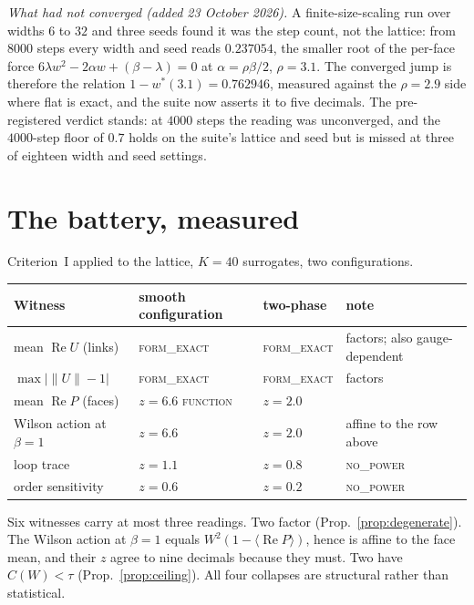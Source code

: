 \documentclass[11pt]{article}
\theoremstyle{remark}
\newcommand{\tier}[1]{\textsc{\MakeLowercase{#1}}}
\begin{document}
\emph{What had not converged (added 23 October 2026).} A finite-size-scaling run over
widths $6$ to $32$ and three seeds found it was the step count, not the lattice: from
$8000$ steps every width and seed reads $0.237054$, the smaller root of the per-face force
$6\lambda w^2 - 2\alpha w + (\beta-\lambda) = 0$ at $\alpha=\rho\beta/2$, $\rho=3.1$. The
converged jump is therefore the relation $1-w^*(3.1)=0.762946$, measured against the
$\rho=2.9$ side where flat is exact, and the suite now asserts it to five decimals. The
pre-registered verdict stands: at $4000$ steps the reading was unconverged, and the
$4000$-step floor of $0.7$ holds on the suite's lattice and seed but is missed at three of
eighteen width and seed settings.

\section{The battery, measured}\label{sec:battery}

Criterion~I applied to the lattice, $K=40$ surrogates, two configurations.

\begin{center}\small
\begin{tabular}{llll}
\toprule
Witness & smooth configuration & two-phase & note \\
\midrule
mean $\operatorname{Re}U$ (links) & \tier{FORM\_EXACT} & \tier{FORM\_EXACT} & factors; also gauge-dependent \\
$\max|\|U\|-1|$ & \tier{FORM\_EXACT} & \tier{FORM\_EXACT} & factors \\
mean $\operatorname{Re}P$ (faces) & $z=6.6$ \tier{FUNCTION} & $z=2.0$ & \\
Wilson action at $\beta=1$ & $z=6.6$ & $z=2.0$ & affine to the row above \\
loop trace & $z=1.1$ & $z=0.8$ & \tier{NO\_POWER} \\
order sensitivity & $z=0.6$ & $z=0.2$ & \tier{NO\_POWER} \\
\bottomrule
\end{tabular}
\end{center}

Six witnesses carry at most three readings. Two factor (Prop.~\ref{prop:degenerate}).
The Wilson action at $\beta=1$ equals $W^2(1-\langle\operatorname{Re}P\rangle)$, hence
is affine to the face mean, and their $z$ agree to nine decimals because they must. Two
have $C(W)<\tau$ (Prop.~\ref{prop:ceiling}). All four collapses are structural rather
than statistical.
\end{document}
